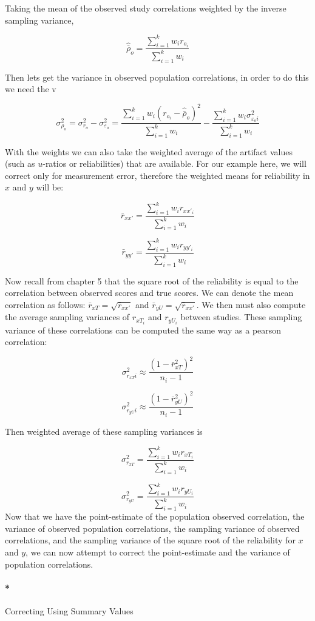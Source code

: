 \documentclass[
  letterpaper,
  DIV=11,
  numbers=noendperiod]{scrreprt}
\let\oldparagraph\paragraph
\renewcommand{\paragraph}[1]{\oldparagraph{#1}\mbox{}}
\begin{document}
Taking the mean of the observed study correlations weighted by the
inverse sampling variance,

\[
\hat{\bar{\rho}}_o=\frac{\sum^k_{i=1}w_i r_{o_i}}{\sum^k_{i=1}w_i}
\]

Then lets get the variance in observed population correlations, in order
to do this we need the v

\[
\sigma^2_{\rho_o}=\sigma^2_{r_o} - \sigma^2_{\varepsilon_o} = \frac{\sum^k_{i=1}w_i (r_{o_i}-\hat{\bar{\rho}}_o)^2}{\sum^k_{i=1}w_i} - \frac{\sum^k_{i=1}w_i \sigma^2_{\varepsilon_oi}}{\sum^k_{i=1}w_i}
\]

With the weights we can also take the weighted average of the artifact
values (such as \(u\)-ratios or reliabilities) that are available. For
our example here, we will correct only for measurement error, therefore
the weighted means for reliability in \(x\) and \(y\) will be:

\[
\bar{r}_{xx'}=\frac{\sum^k_{i=1}w_i r_{xx'_i}}{\sum^k_{i=1}w_i}
\]

\[
\bar{r}_{yy'}=\frac{\sum^k_{i=1}w_i r_{yy'_i}}{\sum^k_{i=1}w_i}
\]

Now recall from chapter 5 that the square root of the reliability is
equal to the correlation between observed scores and true scores. We can
denote the mean correlation as follows:
\(\bar{r}_{xT}=\sqrt{\bar{r}_{xx'}}\) and
\(\bar{r}_{yU}=\sqrt{\bar{r}_{xx'}}\). We then must also compute the
average sampling variances of \(r_{xT_i}\) and \(r_{yU_i}\) between
studies. These sampling variance of these correlations can be computed
the same way as a pearson correlation:

\[
\sigma^2_{r_{xT}i} \approx \frac{(1-\bar{r}_{xT}^2)^2}{n_i-1} 
\]

\[
\sigma^2_{r_{yU}i} \approx \frac{(1-\bar{r}_{yU}^2)^2}{n_i-1} 
\]

Then weighted average of these sampling variances is

\[
\sigma^2_{r_{xT}} = \frac{\sum^k_{i=1}w_i r_{xT_i}}{\sum^k_{i=1}w_i}
\]

\[
\sigma^2_{r_{yU}} = \frac{\sum^k_{i=1}w_i r_{yU_i}}{\sum^k_{i=1}w_i}
\] Now that we have the point-estimate of the population observed
correlation, the variance of observed population correlations, the
sampling variance of observed correlations, and the sampling variance of
the square root of the reliability for \(x\) and \(y\), we can now
attempt to correct the point-estimate and the variance of population
correlations.

\hypertarget{correcting-using-summary-values}{%
\paragraph*{Correcting Using Summary
Values}\label{correcting-using-summary-values}}
\end{document}

